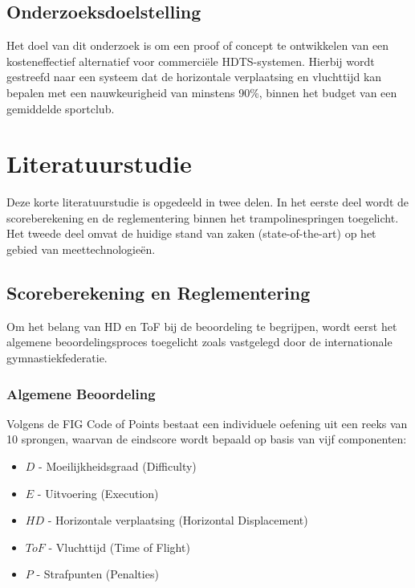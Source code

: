 \subsection*{Onderzoeksdoelstelling}
Het doel van dit onderzoek is om een proof of concept te ontwikkelen van een kosteneffectief alternatief voor commerci{\"e}le HDTS-systemen. Hierbij wordt gestreefd naar een systeem dat de horizontale verplaatsing en vluchttijd kan bepalen met een nauwkeurigheid van minstens 90\%, binnen het budget van een gemiddelde sportclub.


\section{Literatuurstudie}
\label{sec:literatuurstudie}

Deze korte literatuurstudie is opgedeeld in twee delen. In het eerste deel wordt de scoreberekening en de reglementering binnen het trampolinespringen toegelicht. Het tweede deel omvat de huidige stand van zaken (state-of-the-art) op het gebied van meettechnologie{\"e}n.

\subsection{Scoreberekening en Reglementering}
\label{subsec:scoreberekening}

Om het belang van HD en ToF bij de beoordeling te begrijpen, wordt eerst het algemene beoordelingsproces toegelicht zoals vastgelegd door de internationale gymnastiekfederatie.

\subsubsection{Algemene Beoordeling}
Volgens de FIG Code of Points \parencite{FTTC2024} bestaat een individuele oefening uit een reeks van 10 sprongen, waarvan de eindscore wordt bepaald op basis van vijf componenten:

\begin{itemize}
    \item $D$ - Moeilijkheidsgraad (Difficulty)
    \item $E$ - Uitvoering (Execution)
    \item $HD$ - Horizontale verplaatsing (Horizontal Displacement)
    \item $ToF$ - Vluchttijd (Time of Flight)
    \item $P$ - Strafpunten (Penalties)
\end{itemize}

